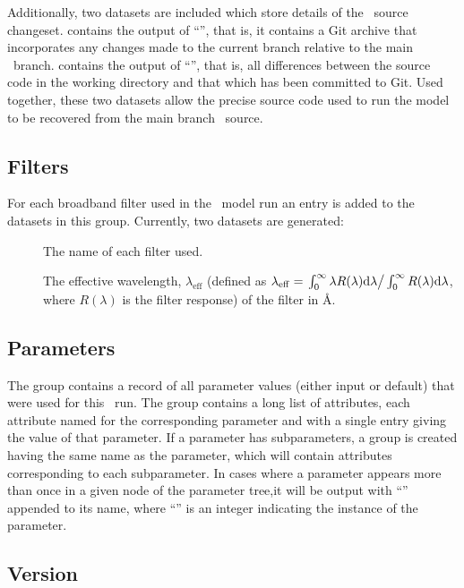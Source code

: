 Additionally, two datasets are included which store details of the \glc\ source changeset.  contains the output of ``'', that is, it contains a Git archive that incorporates any changes made to the current branch relative to the main \glc\ branch.  contains the output of ``'', that is, all differences between the source code in the working directory and that which has been committed to Git. Used together, these two datasets allow the precise source code used to run the model to be recovered from the main branch \glc\ source.

\subsection{Filters}

For each broadband filter used in the \glc\ model run an entry is added to the datasets in this group. Currently, two datasets are generated:
\begin{description}
\item[] The name of each filter used.
\item[] The effective wavelength, $\lambda_\mathrm{eff}$ (defined as $\lambda_\mathrm{eff}=\left. \int_0^\infty \lambda R(\lambda) \mathrm{d}\lambda \right/ \int_0^\infty R(\lambda) \mathrm{d}\lambda$, where $R(\lambda)$ is the filter response) of the filter in \AA.
\end{description}

\subsection{Parameters}\label{sec:outputFile:parametersGroup}

The  group contains a record of all parameter values (either input or default) that were used for this \glc\ run. The group contains a long list of attributes, each attribute named for the corresponding parameter and with a single entry giving the value of that parameter. If a parameter has subparameters, a group is created having the same name as the parameter, which will contain attributes corresponding to each subparameter. In cases where a parameter appears more than once in a given node of the parameter tree,it will be output with ``\mono{[N]}'' appended to its name, where ``'' is an integer indicating the instance of the parameter.

\subsection{Version}

